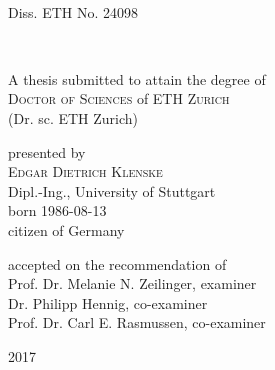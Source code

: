 \begin{titlepage}
    \begin{center}

        ~

        \vfill

        Diss. ETH No. 24098

        \vfill

        \begingroup
            {\LARGE \textsc{\myTitle}} \\
            \bigskip
        \endgroup

        \vfill

        A thesis submitted to attain the degree of\\
        \vspace{2mm}
        {\Large \textsc{Doctor of Sciences} of \textsc{ETH Zurich}}\\
        \vspace{2mm}
        (Dr. sc. ETH Zurich)

        \vfill
        presented by\\
        \vspace{5mm}
        \textsc{\Large Edgar Dietrich Klenske}\\
        \vspace{5mm}
        Dipl.-Ing., University of Stuttgart\\
        born 1986-08-13\\
        citizen of Germany\\

        \vfill

        accepted on the recommendation of\\
        \vspace{5mm}
        Prof. Dr. Melanie N. Zeilinger, examiner\\
        Dr. Philipp Hennig, co-examiner\\
        Prof. Dr. Carl E. Rasmussen, co-examiner

        \vfill

        2017

        \vfill

    \end{center}
\end{titlepage}
